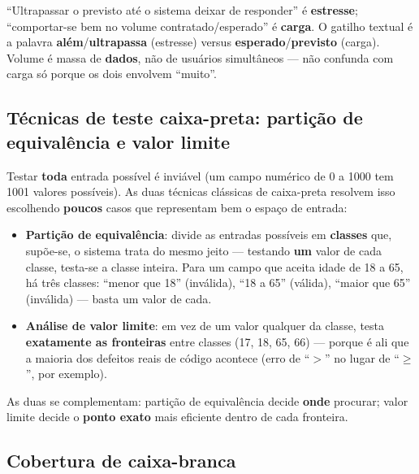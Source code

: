 \begin{cuidado}
“Ultrapassar o previsto até o sistema deixar de responder” é
\textbf{estresse}; “comportar-se bem no volume contratado/esperado” é
\textbf{carga}. O gatilho textual é a palavra \textbf{além}/\textbf{ultrapassa}
(estresse) versus \textbf{esperado}/\textbf{previsto} (carga). Volume é
massa de \textbf{dados}, não de usuários simultâneos --- não confunda com
carga só porque os dois envolvem “muito”.
\end{cuidado}

\subsection{Técnicas de teste caixa-preta: partição de equivalência e valor limite}

\begin{conceito}
Testar \textbf{toda} entrada possível é inviável (um campo numérico de 0 a
1000 tem 1001 valores possíveis). As duas técnicas clássicas de caixa-preta
resolvem isso escolhendo \textbf{poucos} casos que representam bem o espaço
de entrada:

\begin{itemize}
\item \textbf{Partição de equivalência}: divide as entradas possíveis em
\textbf{classes} que, supõe-se, o sistema trata do mesmo jeito --- testando
\textbf{um} valor de cada classe, testa-se a classe inteira. Para um campo
que aceita idade de 18 a 65, há três classes: “menor que 18” (inválida),
“18 a 65” (válida), “maior que 65” (inválida) --- basta um valor de cada.
\item \textbf{Análise de valor limite}: em vez de um valor qualquer da
classe, testa \textbf{exatamente as fronteiras} entre classes (17, 18, 65,
66) --- porque é ali que a maioria dos defeitos reais de código acontece
(erro de “$>$” no lugar de “$\geq$”, por exemplo).
\end{itemize}
As duas se complementam: partição de equivalência decide \textbf{onde}
procurar; valor limite decide o \textbf{ponto exato} mais eficiente dentro
de cada fronteira.
\end{conceito}

\subsection{Cobertura de caixa-branca}

